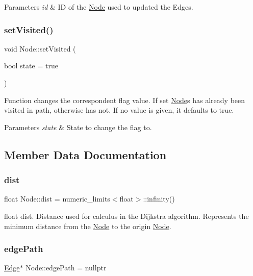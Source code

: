 \begin{DoxyParams}{Parameters}
{\em id} & ID of the \hyperlink{class_node}{Node} used to updated the Edges. \\
\hline
\end{DoxyParams}
\hypertarget{class_node_a9d8e32dbc9c7a9e488b08f4fd1ce178f}{}\label{class_node_a9d8e32dbc9c7a9e488b08f4fd1ce178f} 
\subsubsection{\texorpdfstring{set\+Visited()}{setVisited()}}
{\footnotesize\ttfamily void Node\+::set\+Visited (\begin{DoxyParamCaption}\item[{bool}]{state = {\ttfamily true} }\end{DoxyParamCaption})}

Function changes the correspondent flag value. If set \hyperlink{class_node}{Node}\textquotesingle{}s has already been visited in path, otherwise has not. If no value is given, it defaults to true.


\begin{DoxyParams}{Parameters}
{\em state} & State to change the flag to. \\
\hline
\end{DoxyParams}


\subsection{Member Data Documentation}
\hypertarget{class_node_ae7efda4ec8512d44445f058a479589d3}{}\label{class_node_ae7efda4ec8512d44445f058a479589d3} 
\subsubsection{\texorpdfstring{dist}{dist}}
{\footnotesize\ttfamily float Node\+::dist = numeric\+\_\+limits$<$float$>$\+::infinity()}

float dist. Distance used for calculus in the Dijkstra algorithm. Represents the minimum distance from the \hyperlink{class_node}{Node} to the origin \hyperlink{class_node}{Node}. \hypertarget{class_node_a547c4e0904d03f97ca32a66408b11584}{}\label{class_node_a547c4e0904d03f97ca32a66408b11584} 
\subsubsection{\texorpdfstring{edge\+Path}{edgePath}}
{\footnotesize\ttfamily \hyperlink{class_edge}{Edge}$\ast$ Node\+::edge\+Path = nullptr}

